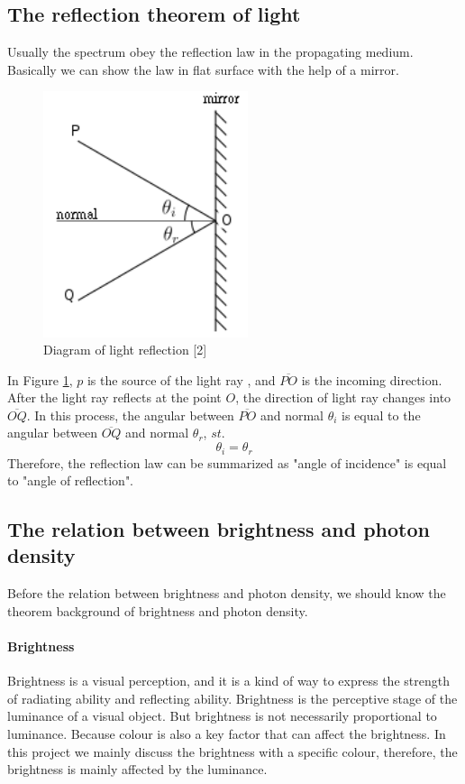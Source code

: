 \documentclass[a4paper]{article}
\begin{document}
\subsection{The reflection theorem of light}
Usually the spectrum obey the reflection law in the propagating medium. Basically we can show the law in flat surface with the help of a mirror. 

\begin{figure}[!htbp]
    \centering
    \includegraphics[width=6cm]{mirror.png}
    \caption{Diagram of light reflection [2]}
    \label{fig:mirror}
\end{figure}

In Figure \ref{fig:mirror}, $p$ is the source of the light ray , and $\overline{PO}$ is the incoming direction.  After the light ray reflects at the point $O$, the direction of light ray changes into $\overline{OQ}$. In this process, the angular between $\overline{PO}$ and normal  $\theta_i$ is equal to the angular between $\overline{OQ}$ and normal $\theta_r$, $st.$
$$ \theta_i=\theta_r $$
Therefore, the reflection law can be summarized as "angle of incidence" is equal to "angle of reflection".
\subsection{The relation between brightness and photon density}
Before the relation between brightness and photon density, we should know the theorem background of brightness and photon density.
\paragraph{Brightness}

Brightness is a visual perception, and it is a kind of way to express the strength of radiating ability and reflecting ability. Brightness is the perceptive stage of the luminance of a visual object. But brightness is not necessarily proportional to luminance. Because colour is also a key factor that can affect the brightness. In this project we mainly discuss the brightness with a specific colour, therefore, the brightness is mainly affected by the luminance.
\end{document}

